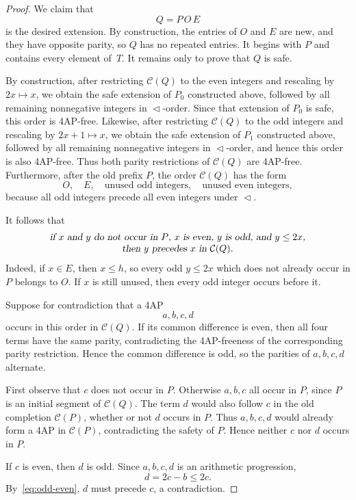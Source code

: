 \documentclass[12pt,reqno]{amsart}
\newcommand{\bits}{\mathrel{\triangleleft}}
\newcommand{\C}[1]{\mathcal C(#1)}
\begin{document}
\begin{proof}
We claim that
$$
Q=P\,O\,E
$$
is the desired extension. By construction, the entries of $O$ and $E$ are new,
and they have opposite parity, so $Q$ has no repeated entries. It begins with
$P$ and contains every element of~$T$. It remains only to prove that $Q$ is
safe.

By construction, after restricting $\C Q$ to the even integers and rescaling
by $2x\mapsto x$, we obtain the safe extension of $P_0$ constructed above,
followed by all remaining nonnegative integers in $\bits$-order. Since that
extension of $P_0$ is safe, this order is 4AP-free. Likewise, after restricting
$\C Q$ to the odd integers and rescaling by $2x+1\mapsto x$, we obtain the safe
extension of $P_1$ constructed above, followed by all remaining nonnegative
integers in $\bits$-order, and hence this order is also 4AP-free. Thus both
parity restrictions of $\C Q$ are 4AP-free. Furthermore, after the old prefix
$P$, the order $\C Q$ has the form
$$
O,\quad E,\quad \text{unused odd integers},\quad
\text{unused even integers},
$$
because all odd integers precede all even integers under $\bits$.

It follows that
\begin{equation}\label{eq:odd-even}
\begin{matrix}
\textsl{if $x$ and $y$ do not occur in $P$, $x$ is even, $y$ is odd,
and $y\le2x$,}\\\textsl{then $y$ precedes $x$ in $\C Q$.}
\end{matrix}
\end{equation}
Indeed, if $x\in E$, then $x\le h$, so every odd $y\le2x$ which does not already
occur in $P$ belongs to $O$. If $x$ is still unused, then every odd integer
occurs before it.

Suppose for contradiction that a 4AP
$$
a,b,c,d
$$
occurs in this order in $\C Q$. If its common difference is even, then all four
terms have the same parity, contradicting the 4AP-freeness of the corresponding
parity restriction. Hence the common difference is odd, so the parities of
$a,b,c,d$ alternate.

First observe that $c$ does not occur in $P$. Otherwise $a,b,c$ all occur in
$P$, since $P$ is an initial segment of $\C Q$. The term $d$ would also follow
$c$ in the old completion $\C P$, whether or not $d$ occurs in $P$. Thus
$a,b,c,d$ would already form a 4AP in $\C P$, contradicting the safety of $P$.
Hence neither $c$ nor $d$ occurs in $P$.

If $c$ is even, then $d$ is odd. Since $a,b,c,d$ is an arithmetic progression,
$$
d=2c-b\le2c.
$$
By~\eqref{eq:odd-even}, $d$ must precede $c$, a contradiction.


\end{proof}
\end{document}

